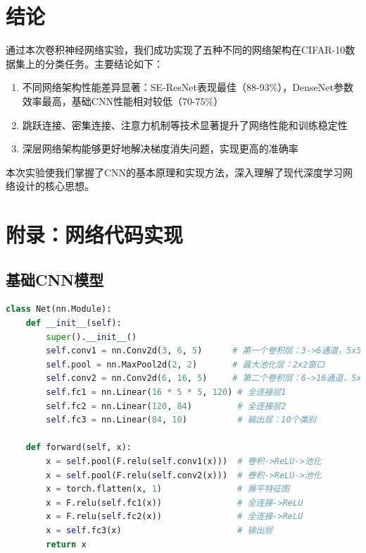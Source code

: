 \documentclass[12pt,a4paper]{article}
\begin{document}
\section{结论}
通过本次卷积神经网络实验，我们成功实现了五种不同的网络架构在CIFAR-10数据集上的分类任务。主要结论如下：

\begin{enumerate}
    \item 不同网络架构性能差异显著：SE-ResNet表现最佳（88-93\%），DenseNet参数效率最高，基础CNN性能相对较低（70-75\%）
    \item 跳跃连接、密集连接、注意力机制等技术显著提升了网络性能和训练稳定性
    \item 深层网络架构能够更好地解决梯度消失问题，实现更高的准确率
\end{enumerate}

本次实验使我们掌握了CNN的基本原理和实现方法，深入理解了现代深度学习网络设计的核心思想。





\appendix
\section{附录：网络代码实现}
\label{appendix:code}

\subsection{基础CNN模型}
\begin{lstlisting}[language=Python, caption=基础CNN模型结构]
class Net(nn.Module):
    def __init__(self):
        super().__init__()
        self.conv1 = nn.Conv2d(3, 6, 5)      # 第一个卷积层：3->6通道，5x5卷积核
        self.pool = nn.MaxPool2d(2, 2)       # 最大池化层：2x2窗口
        self.conv2 = nn.Conv2d(6, 16, 5)     # 第二个卷积层：6->16通道，5x5卷积核
        self.fc1 = nn.Linear(16 * 5 * 5, 120) # 全连接层1
        self.fc2 = nn.Linear(120, 84)         # 全连接层2
        self.fc3 = nn.Linear(84, 10)          # 输出层：10个类别

    def forward(self, x):
        x = self.pool(F.relu(self.conv1(x)))  # 卷积->ReLU->池化
        x = self.pool(F.relu(self.conv2(x)))  # 卷积->ReLU->池化
        x = torch.flatten(x, 1)               # 展平特征图
        x = F.relu(self.fc1(x))               # 全连接->ReLU
        x = F.relu(self.fc2(x))               # 全连接->ReLU
        x = self.fc3(x)                       # 输出层
        return x
\end{lstlisting}
\end{document}
